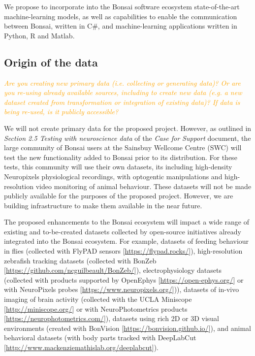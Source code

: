 \documentclass[a4paper,11pt]{article}
\renewcommand{\footnote}[1]{ [#1]}
\begin{document}
We propose to incorporate into the Bonsai software ecosystem state-of-the-art
machine-learning models, as well as capabilities to enable the communication
between Bonsai, written in C\#, and machine-learning applications written in
Python, R and Matlab.

\subsection{Origin of the data}

\textcolor{orange}{\textit{Are you creating new primary data (i.e. collecting or
generating data)? Or are you re-using already available sources, including to
create new data (e.g. a new dataset created from transformation or integration
of existing data)? If data is being re-used, is it publicly accessible?}}

We will not create primary data for the proposed project. However, as outlined
in \emph{Section 2.5 Testing with neuroscience data} of the \emph{Case for
Support} document, the large community of Bonsai users at the Sainsbuy Wellcome
Centre (SWC) will test the new functionality added to Bonsai prior to its
distribution. For these tests, this community will use their own datasets, its
including high-density Neuropixels physiological recordings, with optogentic
manipulations and high-resolution video monitoring of animal behaviour. These
datasets will not be made publicly available for the purposes of the proposed
project. However, we are building infrastructure to make them available in the
near future.

The proposed enhancements to the Bonsai ecosystem will impact a wide range of
existing and to-be-created datasets collected by open-source initiatives
already integrated into the Bonsai ecosystem. For example, datasets of feeding
behaviour in flies (collected with FlyPAD
sensors\footnote{\url{https://flypad.rocks/}}), high-resolution zebrafish
tracking datasets (collected with
BonZeb\footnote{\url{https://github.com/ncguilbeault/BonZeb/}}),
electrophysiology datasets (collected with products supported by
OpenEphys\footnote{\url{https://open-ephys.org/}} or with NeuroPixels
probes\footnote{\url{https://www.neuropixels.org/}})), datasets of in-vivo
imaging of brain activity (collected with the UCLA
Miniscope\footnote{\url{http://miniscope.org/}} or with NeuroPhotometrics
products\footnote{\url{https://neurophotometrics.com/}}), datasets using rich
2D or 3D visual environments (created with
BonVision\footnote{\url{https://bonvision.github.io/}}), and animal behavioral
datasets (with body parts tracked with
DeepLabCut\footnote{\url{http://www.mackenziemathislab.org/deeplabcut}}).
\end{document}
